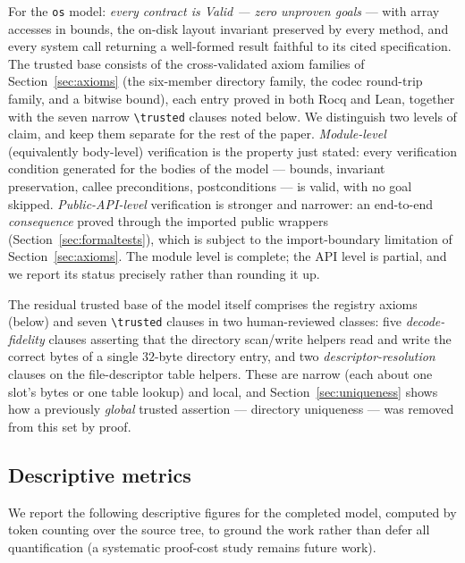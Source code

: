 \documentclass[11pt]{article}
\newcommand{\rocq}{\textsf{Rocq}}
\newcommand{\lean}{\textsf{Lean}}
\newcommand{\osmod}{\texttt{os}}
\begin{document}
For the \osmod{} model: \emph{every contract is Valid --- zero unproven
goals} --- with array accesses in bounds, the on-disk layout invariant
preserved by every method, and every system call returning a well-formed
result faithful to its cited specification. The trusted base consists of the
cross-validated axiom families of Section~\ref{sec:axioms} (the six-member directory family, the codec
round-trip family, and a bitwise bound), each entry proved in both \rocq{} and
\lean{}, together with the seven narrow \texttt{\textbackslash trusted}
clauses noted below. We distinguish two levels of claim, and keep them separate for the rest of
the paper. \emph{Module-level} (equivalently body-level) verification is the
property just stated: every verification condition generated for the bodies of
the model --- bounds, invariant preservation, callee preconditions,
postconditions --- is valid, with no goal skipped. \emph{Public-API-level}
verification is stronger and narrower: an end-to-end \emph{consequence} proved
through the imported public wrappers (Section~\ref{sec:formaltests}), which is
subject to the import-boundary limitation of Section~\ref{sec:axioms}. The
module level is complete; the API level is partial, and we report its status
precisely rather than rounding it up.

The residual trusted base of the model itself comprises the registry axioms
(below) and seven \texttt{\textbackslash trusted} clauses in two
human-reviewed classes: five \emph{decode-fidelity} clauses asserting that the
directory scan/write helpers read and write the correct bytes of a single
$32$-byte directory entry, and two \emph{descriptor-resolution} clauses on the
file-descriptor table helpers. These are narrow (each about one slot's bytes or
one table lookup) and local, and Section~\ref{sec:uniqueness} shows how a
previously \emph{global} trusted assertion --- directory uniqueness --- was
removed from this set by proof.

\subsection{Descriptive metrics}\label{sec:metrics}

We report the following descriptive figures for the completed model, computed
by token counting over the source tree, to ground the work rather than defer
all quantification (a systematic proof-cost study remains future work).
\end{document}
